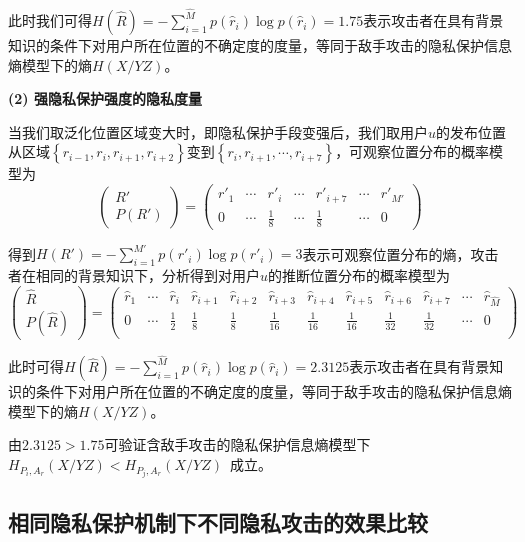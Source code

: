 此时我们可得$H(\hat{R})=-\sum_{i=1}^{\hat{M}}p(\hat{r}_{i})\log p(\hat{r}_{i})=1.75
$表示攻击者在具有背景知识的条件下对用户所在位置的不确定度的度量，等同于敌手攻击的隐私保护信息熵模型下的熵$H(X/YZ)$。

\textbf{(2) 强隐私保护强度的隐私度量}

当我们取泛化位置区域变大时，即隐私保护手段变强后，我们取用户$u$的发布位置从区域$\left \{ r_{i-1},r_{i},r_{i+1},r_{i+2} \right \}$变到$\left \{ r_{i},r_{i+1},\cdots,r_{i+7} \right \}$，可观察位置分布的概率模型为
\begin{equation}
\begin{pmatrix}
{R}'\\ 
P({R}')
\end{pmatrix}=\begin{pmatrix}
{r}'_{1} & \cdots & {r}'_{i}  & \cdots & {r}'_{i+7} & \cdots & {r}'_{{M}'}\\ 
0 & \cdots  & \frac{1}{8} & \cdots  & \frac{1}{8} & \cdots  & 0
\end{pmatrix}
\end{equation}

得到$H({R}')=-\sum_{i=1}^{{M}'}p({r}'_{i})\log p({r}'_{i})=3$表示可观察位置分布的熵，攻击者在相同的背景知识下，分析得到对用户$u$的推断位置分布的概率模型为
\begin{equation}
\begin{pmatrix}
\hat{R}\\ 
P(\hat{R})
\end{pmatrix}=\left( \begin{array}{cccccccccccc} 
\hat{r}_{1} & \cdots  & \hat{r}_{i} & \hat{r}_{i+1} & \hat{r}_{i+2} & \hat{r}_{i+3} & \hat{r}_{i+4} & \hat{r}_{i+5} & \hat{r}_{i+6} & \hat{r}_{i+7} & \cdots  & \hat{r}_{\hat{M}} \\
0 & \cdots  & \frac{1}{2} & \frac{1}{8} & \frac{1}{8} & \frac{1}{16} & \frac{1}{16} & \frac{1}{16} & \frac{1}{32} & \frac{1}{32} & \cdots  & 0\\
\end{array} \right)
\end{equation}

此时可得$H(\hat{R})=-\sum_{i=1}^{\hat{M}}p(\hat{r}_{i})\log p(\hat{r}_{i})=2.3125$表示攻击者在具有背景知识的条件下对用户所在位置的不确定度的度量，等同于敌手攻击的隐私保护信息熵模型下的熵$H(X/YZ)$。

由$2.3125>1.75$可验证含敌手攻击的隐私保护信息熵模型下~$H_{P_{i},A_{r}}(X/YZ)<H_{P_{j},A_{r}}(X/YZ)$~成立。

\subsection{相同隐私保护机制下不同隐私攻击的效果比较}

